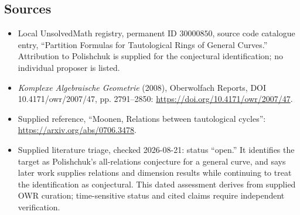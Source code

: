 \documentclass[11pt]{article}
\begin{document}
\subsection{Sources}
\begin{itemize}
\item Local UnsolvedMath registry, permanent ID \(30000850\), source code catalogue entry, ``Partition Formulas for Tautological Rings of General Curves.'' Attribution to Polishchuk is supplied for the conjectural identification; no individual proposer is listed.
\item \emph{Komplexe Algebraische Geometrie} (2008), Oberwolfach Reports, DOI 10.4171/owr/2007/47, pp. 2791--2850: \url{https://doi.org/10.4171/owr/2007/47}.
\item Supplied reference, ``Moonen, Relations between tautological cycles'': \url{https://arxiv.org/abs/0706.3478}.
\item Supplied literature triage, checked 2026-08-21: status ``open.'' It identifies the target as Polishchuk's all-relations conjecture for a general curve, and says later work supplies relations and dimension results while continuing to treat the identification as conjectural. This dated assessment derives from supplied OWR curation; time-sensitive status and cited claims require independent verification.
\end{itemize}
\end{document}
